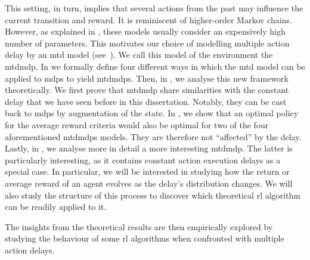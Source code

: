 This setting, in turn, implies that several actions from the past may influence the current transition and reward.
It is reminiscent of higher-order Markov chains. 
However, as explained in , these models usually consider an expensively high number of parameters.
This motivates our choice of modelling multiple action delay by an \gls{mtd} model (see~). 
We call this model of the environment the \gls{mtdmdp}. 
In  we formally define four different ways in which the \gls{mtd} model can be applied to \glspl{mdp} to yield \glspl{mtdmdp}.
Then, in , we analyse this new framework theoretically. 
We first prove that \gls{mtdmdp} share similarities with the constant delay that we have seen before in this dissertation. 
Notably, they can be cast back to \glspl{mdp} by augmentation of the state.
In , we show that an optimal policy for the average reward criteria would also be optimal for two of the four aforementioned \glspl{mtdmdp} models.
They are therefore not ``affected'' by the delay.
Lastly, in , we analyse more in detail a more interesting \gls{mtdmdp}. 
The latter is particularly interesting, as it contains constant action execution delays as a special case.
In particular, we will be interested in studying how the return or average reward of an agent evolves as the delay's distribution changes.
We will also study the structure of this process to discover which theoretical \gls{rl} algorithm can be readily applied to it. 

The insights from the theoretical results are then empirically explored by studying the behaviour of some \gls{rl} algorithms when confronted with multiple action delays. 





